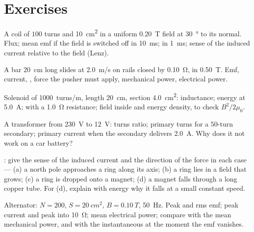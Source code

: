 \section{Exercises}

\begin{exercise}[$\star$]\label{exo:b1:induction:1}
A coil of $100$ turns and \qty{10}{cm^2} in a uniform \qty{0.20}{T} field at
\qty{30}{\degree} to its normal. Flux; mean emf if the field is switched
off in \qty{10}{ms}; in \qty{1}{ms}; sense of the induced current
relative to the field (Lenz).
\end{exercise}

\begin{exercise}[$\star$]\label{exo:b1:induction:2}
A bar \qty{20}{cm} long slides at \qty{2.0}{m/s} on rails closed by
\qty{0.10}{\ohm}, in \qty{0.50}{T}. Emf, current, , force the
pusher must apply, mechanical power, electrical power.
\end{exercise}

\begin{exercise}[$\star$]\label{exo:b1:induction:3}
Solenoid of \qty{1000}{turns/m}, length \qty{20}{cm}, section \qty{4.0}{cm^2}:
inductance; energy at \qty{5.0}{A};  with a \qty{1.0}{\ohm}
resistance; field inside and energy density, to check $B^2/2\mu_0$.
\end{exercise}

\begin{exercise}[$\star$]\label{exo:b1:induction:4}
A transformer from \qty{230}{V} to \qty{12}{V}: turns ratio; primary
turns for a $50$-turn secondary; primary current when the secondary
delivers \qty{2.0}{A}. Why does it not work on a car battery?
\end{exercise}

\begin{exercise}[$\star\star$]\label{exo:b1:induction:5}
: give the sense of the induced current and the direction of
the force in each case --- (a) a north pole approaches a ring along
its axis; (b) a ring lies in a field that grows; (c) a ring is dropped
onto a magnet; (d) a magnet falls through a long copper tube. For (d),
explain with energy why it falls at a small constant speed.
\end{exercise}

\begin{exercise}[$\star\star$]\label{exo:b1:induction:6}
Alternator: $N = 200$, $S = \qty{20}{cm^2}$, $B = \qty{0.10}{T}$, \qty{50}{Hz}.
Peak and rms emf; peak current and peak  into \qty{10}{\ohm}; mean
electrical power; compare with the mean mechanical power, and with the
instantaneous  at the moment the emf vanishes.
\end{exercise}

